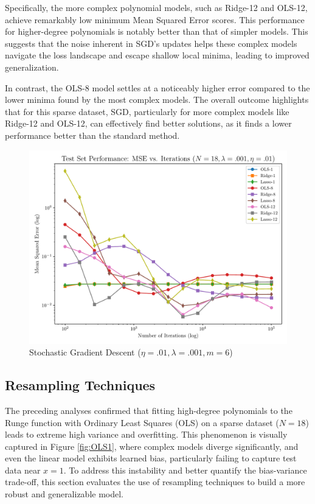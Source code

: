 \documentclass[twocolumn,aps]{revtex4}
\begin{document}
Specifically, the more complex polynomial models, such as Ridge-12 and OLS-12, achieve remarkably low minimum Mean Squared Error scores. This performance for higher-degree polynomials is notably better than that of simpler models. This suggests that the noise inherent in SGD's updates helps these complex models navigate the loss landscape and escape shallow local minima, leading to improved generalization.

In contrast, the OLS-8 model settles at a noticeably higher error compared to the lower minima found by the most complex models. 
The overall outcome highlights that for this sparse dataset, SGD, particularly for more complex models like Ridge-12 and OLS-12, can effectively find better solutions, as it finds a lower performance better than the standard method.


\begin{figure}[h]
    \centering
    \includegraphics[width=.95 \linewidth]{Figures/StochasticDescent.pdf}
    \caption{Stochastic Gradient Descent ($\eta=.01, \lambda=.001, m=6$)}
    \label{fig:GradSGD}
\end{figure}
\subsection{Resampling Techniques}
The preceding analyses confirmed that fitting high-degree polynomials to the Runge function with Ordinary Least Squares (OLS) on a sparse dataset ($N=18$) leads to extreme high variance and overfitting. 
This phenomenon is visually captured in Figure \ref{fig:OLS1}, where complex models diverge significantly, and even the linear model exhibits learned bias, particularly failing to capture test data near $x=1$. 
To address this instability and better quantify the bias-variance trade-off, this section evaluates the use of resampling techniques to build a more robust and generalizable model.
\end{document}
